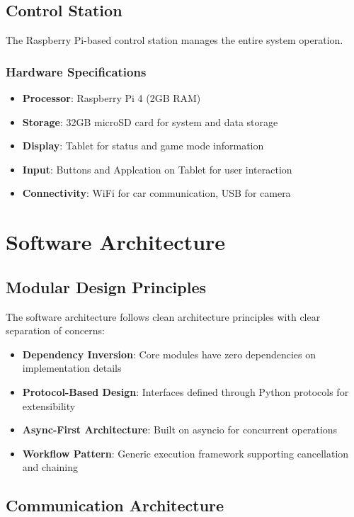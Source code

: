 \subsection{Control Station}

The Raspberry Pi-based control station manages the entire system operation.

\subsubsection{Hardware Specifications}
\begin{itemize}
    \item \textbf{Processor}: Raspberry Pi 4 (2GB RAM)
    \item \textbf{Storage}: 32GB microSD card for system and data storage
    \item \textbf{Display}: Tablet for status and game mode information
    \item \textbf{Input}: Buttons and Applcation on Tablet for user interaction
    \item \textbf{Connectivity}: WiFi for car communication, USB for camera
\end{itemize}

\section{Software Architecture}

\subsection{Modular Design Principles}

The software architecture follows clean architecture principles with clear separation of concerns:

\begin{itemize}
    \item \textbf{Dependency Inversion}: Core modules have zero dependencies on implementation details
    \item \textbf{Protocol-Based Design}: Interfaces defined through Python protocols for extensibility
    \item \textbf{Async-First Architecture}: Built on asyncio for concurrent operations
    \item \textbf{Workflow Pattern}: Generic execution framework supporting cancellation and chaining
\end{itemize}

\subsection{Communication Architecture}

